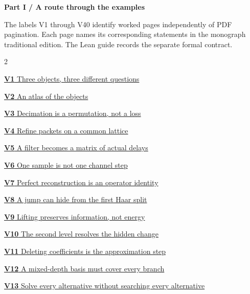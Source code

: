 \documentclass[11pt,letterpaper]{article}
\begin{document}
\KomorebiCover
{}


{\sffamily\bfseries\Large\color{accent}Part I / A route through the examples}\par\medskip
The labels V1 through V40 identify worked pages independently of PDF
pagination. Each page names its corresponding statements in the monograph
traditional edition. The Lean guide records the separate formal contract.
\medskip
\begin{multicols}{2}\raggedright
{\small\noindent\hyperlink{vpage1}{\textbf{V1} Three objects, three different questions}\par\smallskip}
{\small\noindent\hyperlink{vpage2}{\textbf{V2} An atlas of the objects}\par\smallskip}
{\small\noindent\hyperlink{vpage3}{\textbf{V3} Decimation is a permutation, not a loss}\par\smallskip}
{\small\noindent\hyperlink{vpage4}{\textbf{V4} Refine packets on a common lattice}\par\smallskip}
{\small\noindent\hyperlink{vpage5}{\textbf{V5} A filter becomes a matrix of actual delays}\par\smallskip}
{\small\noindent\hyperlink{vpage6}{\textbf{V6} One sample is not one channel step}\par\smallskip}
{\small\noindent\hyperlink{vpage7}{\textbf{V7} Perfect reconstruction is an operator identity}\par\smallskip}
{\small\noindent\hyperlink{vpage8}{\textbf{V8} A jump can hide from the first Haar split}\par\smallskip}
{\small\noindent\hyperlink{vpage9}{\textbf{V9} Lifting preserves information, not energy}\par\smallskip}
{\small\noindent\hyperlink{vpage10}{\textbf{V10} The second level resolves the hidden change}\par\smallskip}
{\small\noindent\hyperlink{vpage11}{\textbf{V11} Deleting coefficients is the approximation step}\par\smallskip}
{\small\noindent\hyperlink{vpage12}{\textbf{V12} A mixed-depth basis must cover every branch}\par\smallskip}
{\small\noindent\hyperlink{vpage13}{\textbf{V13} Solve every alternative without searching every alternative}\par\smallskip}

\end{multicols}
\end{document}
